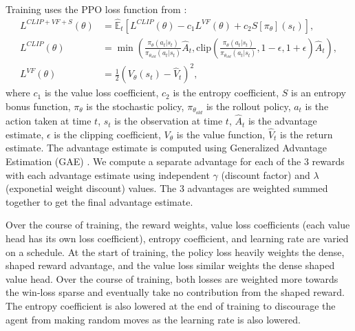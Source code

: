 \documentclass{article}
\begin{document}
Training uses the PPO loss function from
\citet{DBLP:journals/corr/SchulmanWDRK17}:
\begin{align}
    L^{CLIP+VF+S}(\theta) &= \hat{\mathbb{E}}_t \left[ L^{CLIP}(\theta) - c_1 L^{VF}(\theta) + c_2 S\left[\pi_\theta\right](s_t) \right], \\
    L^{CLIP}(\theta) &= \min \left( \frac{\pi_\theta(a_t|s_t)}{\pi_{\theta_{old}}(a_t|s_t)} \hat{A}_t, \text{clip}\left( \frac{\pi_\theta(a_t|s_t)}{\pi_{\theta_{old}}(a_t|s_t)}, 1-\epsilon, 1+\epsilon \right) \hat{A}_t \right), \\
    L^{VF}(\theta) &= \frac{1}{2} \left( V_\theta(s_t) - \hat{V}_t \right)^2,
\end{align}
where $c_1$ is the value loss coefficient, $c_2$ is the entropy coefficient, $S$ is an
entropy bonus function, $\pi_\theta$ is the stochastic policy, $\pi_{\theta_{old}}$ is the rollout policy, $a_t$
is the action taken at time $t$, $s_t$ is the observation at time $t$, $\hat{A}_t$
is the advantage estimate,  $\epsilon$ is the clipping coefficient, $V_\theta$ is the
value function, $\hat{V}_t$ is the return estimate. The advantage estimate is computed
using Generalized Advantage Estimation (GAE) \citep{DBLP:journals/corr/SchulmanMLJA15}.
We compute a separate advantage for each of the 3 rewards with each advantage estimate
using independent $\gamma$ (discount factor) and $\lambda$ (exponetial weight discount)
values. The 3 advantages are weighted summed together to get the final advantage
estimate.

Over the course of training, the reward weights, value loss coefficients (each value
head has its own loss coefficient), entropy coefficient, and learning rate are varied on
a schedule. At the start of training, the policy loss heavily weights the dense, shaped 
reward advantage, and the value loss similar weights the dense shaped value head. Over
the course of training, both losses are weighted more towards the win-loss sparse and
eventually take no contribution from the shaped reward. The entropy coefficient is also
lowered at the end of training to discourage the agent from making random moves as the
learning rate is also lowered.
\end{document}
